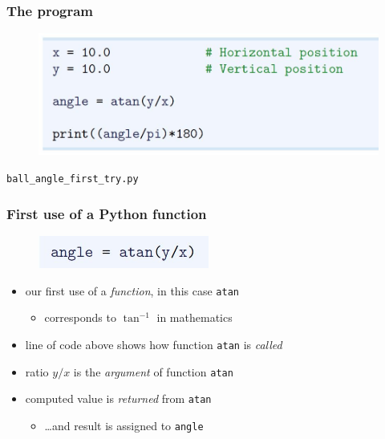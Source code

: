 \documentclass[14pt]{beamer}
\newcommand\red[1]{{\color{red} #1}}
\begin{document}
\begin{frame}[fragile]
\frametitle{The program}

\begin{figure}[ht]
	\centering
	\includegraphics[width=\textwidth]{figures/LLp12}
\end{figure}

\begin{center}
\texttt{ball\_angle\_first\_try.py}
\end{center}

\end{frame}


\begin{frame}[fragile]
\frametitle{First use of a Python function}

\begin{figure}[ht]
	\centering
	\includegraphics[width=0.5\textwidth]{figures/LLp12a}
\end{figure}

\begin{itemize}
	\item our first use of a \red{\emph{function}}, in this case \texttt{atan}
	\begin{itemize}
		\item corresponds to $\tan^{-1}$ in mathematics
	\end{itemize}
	\item line of code above shows how function \texttt{atan} is \red{\emph{called}}
	\item ratio $y/x$ is the \red{\emph{argument}} of function \texttt{atan}
	\item computed value is \red{\emph{returned}} from \texttt{atan}
	\begin{itemize}
		\item \ldots and result is assigned to \texttt{angle}
	\end{itemize}
\end{itemize}

\end{frame}
\end{document}
